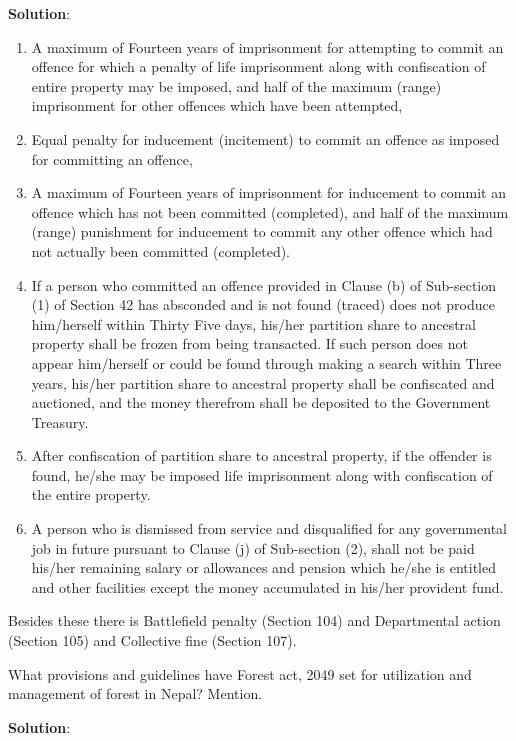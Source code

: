 \documentclass[
  openany]{book}
\newcommand{\question}{\item}
\newenvironment{solution}{ {\bfseries Solution}:}{}
\begin{document}
\begin{questions}
\begin{solution}
\begin{enumerate}
  \begin{enumerate}
    \item A maximum of Fourteen years of imprisonment for attempting to commit an offence for which a penalty of life imprisonment along with confiscation of entire property may be imposed, and half of the maximum (range) imprisonment for other offences which have been attempted,
    \item Equal penalty for inducement (incitement) to commit an offence as imposed for committing an offence,
    \item A maximum of Fourteen years of imprisonment for inducement to commit an offence which has not been committed (completed), and half of the maximum (range) punishment for inducement to commit any other offence which had not actually been committed (completed).
    \item If a person who committed an offence provided in Clause (b) of Sub-section (1) of Section 42 has absconded and is not found (traced) does not produce him/herself within Thirty Five days, his/her partition share to ancestral property shall be frozen from being transacted. If such person does not appear him/herself or could be found through making a search within Three years, his/her partition share to ancestral property shall be confiscated and auctioned, and the money therefrom shall be deposited to the Government Treasury.
    \item After confiscation of partition share to ancestral property, if the  offender is found, he/she may be imposed life imprisonment along with confiscation of the entire property.
    \item A person who is dismissed from service and disqualified for any governmental job in future pursuant to Clause (j) of Sub-section (2), shall not be paid his/her remaining salary or allowances and pension which he/she is entitled and other facilities except the money accumulated in his/her provident fund.
  \end{enumerate}
\end{enumerate}

Besides these there is Battlefield penalty (Section 104) and Departmental action (Section 105) and Collective fine (Section 107).

\end{solution}

\question What provisions and guidelines have Forest act, 2049 set for utilization and management of forest in Nepal? Mention.

\begin{solution}


\end{solution}
\end{questions}
\end{document}
